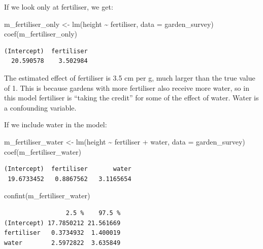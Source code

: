 \documentclass[
  letterpaper,
  8pt,
  a4paper]{book}
\newenvironment{Shaded}{\begin{snugshade}}{\end{snugshade}}
\newcommand{\AttributeTok}[1]{\textcolor[rgb]{0.40,0.45,0.13}{#1}}
\newcommand{\FunctionTok}[1]{\textcolor[rgb]{0.28,0.35,0.67}{#1}}
\newcommand{\NormalTok}[1]{\textcolor[rgb]{0.00,0.23,0.31}{#1}}
\newcommand{\OtherTok}[1]{\textcolor[rgb]{0.00,0.23,0.31}{#1}}
\newcommand{\SpecialCharTok}[1]{\textcolor[rgb]{0.37,0.37,0.37}{#1}}
\begin{document}
If we look only at fertiliser, we get:

\begin{Shaded}
\begin{Highlighting}[]
\NormalTok{m\_fertiliser\_only }\OtherTok{\textless{}{-}} \FunctionTok{lm}\NormalTok{(height }\SpecialCharTok{\textasciitilde{}}\NormalTok{ fertiliser, }\AttributeTok{data =}\NormalTok{ garden\_survey)}
\FunctionTok{coef}\NormalTok{(m\_fertiliser\_only)}
\end{Highlighting}
\end{Shaded}

\begin{verbatim}
(Intercept)  fertiliser 
  20.590578    3.502984 
\end{verbatim}

The estimated effect of fertiliser is 3.5 cm per g, much larger than the
true value of 1. This is because gardens with more fertiliser also
receive more water, so in this model fertiliser is ``taking the credit''
for some of the effect of water. Water is a confounding variable.

If we include water in the model:

\begin{Shaded}
\begin{Highlighting}[]
\NormalTok{m\_fertiliser\_water }\OtherTok{\textless{}{-}} \FunctionTok{lm}\NormalTok{(height }\SpecialCharTok{\textasciitilde{}}\NormalTok{ fertiliser }\SpecialCharTok{+}\NormalTok{ water, }\AttributeTok{data =}\NormalTok{ garden\_survey)}
\FunctionTok{coef}\NormalTok{(m\_fertiliser\_water)}
\end{Highlighting}
\end{Shaded}

\begin{verbatim}
(Intercept)  fertiliser       water 
 19.6733452   0.8867562   3.1165654 
\end{verbatim}

\begin{Shaded}
\begin{Highlighting}[]
\FunctionTok{confint}\NormalTok{(m\_fertiliser\_water)}
\end{Highlighting}
\end{Shaded}

\begin{verbatim}
                 2.5 %    97.5 %
(Intercept) 17.7850212 21.561669
fertiliser   0.3734932  1.400019
water        2.5972822  3.635849
\end{verbatim}
\end{document}

